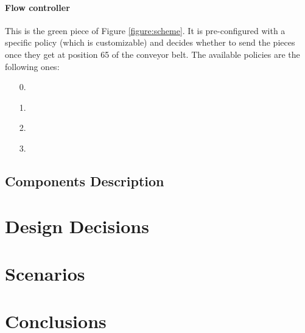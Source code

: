 \documentclass[a4paper]{article}
\newcommand{\figureref}[1]{Figure \ref{#1}}
\begin{document}
    \paragraph{Flow controller} This is the green piece of \figureref{figure:scheme}. It is pre-configured with a specific policy (which is customizable) and decides whether to send the pieces once they get at position 65 of the conveyor belt. The available policies are the following ones:
    \begin{enumerate}
        \item[0.] %
        \item[1.] %
        \item[2.] %
        \item[3.] %
    \end{enumerate}

    \subsection{Components Description}

    \section{Design Decisions} \label{section:design_decisions}

    \section{Scenarios}

    \section{Conclusions}
\end{document}
